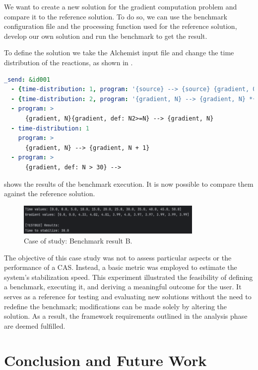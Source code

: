 \documentclass[12pt,a4paper,openright,twoside]{book}
\begin{document}
We want to create a new solution for the gradient computation problem and compare it to the reference solution.
To do so, we can use the benchmark configuration file and the processing function used for the reference solution,
develop our own solution and run the benchmark to get the result.

To define the solution we take the Alchemist input file and change the time distribution of the reactions, as shown in .

\begin{lstlisting}[language=yaml, label={lst:cos-alchem-solB}, caption={Case of study: gradient program B.}]
  _send: &id001
  - {time-distribution: 1, program: '{source} --> {source} {gradient, 0}'}
  - {time-distribution: 2, program: '{gradient, N} --> {gradient, N} *{gradient, N+#D}'}
  - program: >
      {gradient, N}{gradient, def: N2>=N} --> {gradient, N}
  - time-distribution: 1
    program: >
      {gradient, N} --> {gradient, N + 1}
  - program: >
      {gradient, def: N > 30} -->
\end{lstlisting}

 shows the results of the benchmark execution.
It is now possible to compare them against the reference solution.

\begin{figure}[H]
  \centering
  \includegraphics[width=0.8\textwidth]{figures/result-B.png}
  \caption{Case of study: Benchmark result B.}
  \label{fig:result-B}
\end{figure}

The objective of this case study was not to assess particular aspects or the performance of a CAS. 
Instead, a basic metric was employed to estimate the system's stabilization speed.
This experiment illustrated the feasibility of defining a benchmark, executing it, and deriving a meaningful outcome for the user. 
It serves as a reference for testing and evaluating new solutions without the need to redefine the benchmark; modifications can be made solely by altering the solution. 
As a result, the framework requirements outlined in the analysis phase are deemed fulfilled.

\chapter{Conclusion and Future Work}
\label{ch:conclusion}
\end{document}
